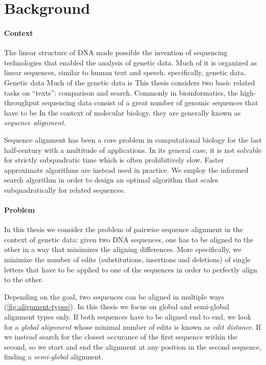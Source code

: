 \section*{Background}

\paragraph{Context}
The linear structure of DNA\citep{watson1953structure} made possible the
invention of sequencing technologies that enabled the analysis of genetic data.
Much of it is organized as linear sequences, similar to human text and speech.
specifically, genetic data. Genetic data Much of the genetic data is This thesis
considers two basic related tasks on ``texts'': comparison and search. Commonly
in bioinformatics, the high-throughput sequencing data consist of a great number
of genomic sequences that have to be In the context of molecular biology, they
are generally known as \emph{sequence alignment}.

Sequence alignment has been a core problem in
computational biology for the last half-century with a multitude of
applications. In its general case, it is not solvable for strictly subquadratic
time which is often prohibitively slow. Faster approximate algorithms are
instead used in practice. We employ  
the \A informed search algorithm in order to design an optimal algorithm that
scales subquadratically for related sequences.

\paragraph{Problem}
In this thesis we consider the problem of pairwise sequence alignment in the
context of genetic data: given two DNA sequences, one has to be aligned to the
other in a way that minimizes the aligning differences. More specifically, we
minimize the number of edits (substitutions, insertions and deletions) of single
letters that have to be applied to one of the sequences in order to perfectly
align to the other.

Depending on the goal, two sequences can be aligned in multiple ways
(\cref{fig:alignment-types}). In this thesis we focus on global and semi-global
alignment types only. If both sequences have to be aligned end to end, we look
for a \emph{global alignment} whose minimal number of edits is known as
\emph{edit distance}. If we instead search for the closest occurance of the
first sequence within the second, so we start and end the alignment at any
position in the second sequence, finding a \emph{semi-global} alignment.

